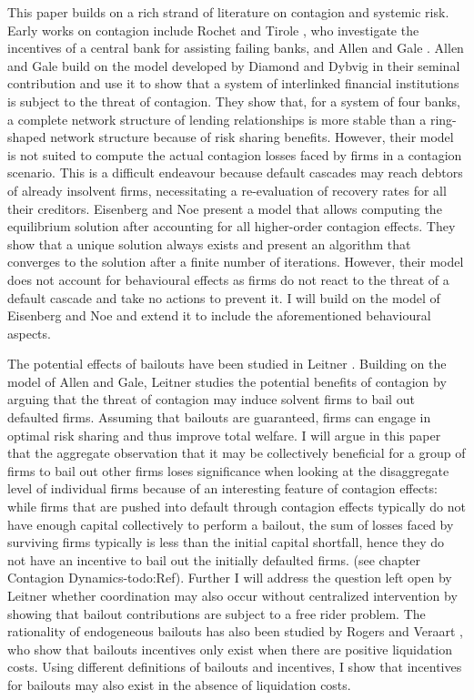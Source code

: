 \documentclass[12pt,a4paper]{article}
\begin{document}
This paper builds on a rich strand of literature on contagion and systemic risk. Early works on contagion include Rochet and Tirole \cite{Rochet1996}, who investigate the incentives of a central bank for assisting failing banks, and Allen and Gale \cite{Allen2000}. Allen and Gale build on the model developed by Diamond and Dybvig \cite{Diamond1983} in their seminal contribution and use it to show that a system of interlinked financial institutions is subject to the threat of contagion. They show that, for a system of four banks, a complete network structure of lending relationships is more stable than a ring-shaped network structure because of risk sharing benefits. However, their model is not suited to compute the actual contagion losses faced by firms in a contagion scenario. This is a difficult endeavour because default cascades may reach debtors of already insolvent firms, necessitating a re-evaluation of recovery rates for all their creditors. Eisenberg and Noe \cite{Eisenberg2001} present a model that allows computing the equilibrium solution after accounting for all higher-order contagion effects. They show that a unique solution always exists and present an algorithm that converges to the solution after a finite number of iterations. However, their model does not account for behavioural effects as firms do not react to the threat of a default cascade and take no actions to prevent it. I will build on the model of Eisenberg and Noe and extend it to include the aforementioned behavioural aspects.

The potential effects of bailouts have been studied in Leitner \cite{Leitner2005}. Building on the model of Allen and Gale, Leitner studies the potential benefits of contagion by arguing that the threat of contagion may induce solvent firms to bail out defaulted firms. Assuming that bailouts are guaranteed, firms can engage in optimal risk sharing and thus improve total welfare. I will argue in this paper that the aggregate observation that it may be collectively beneficial for a group of firms to bail out other firms loses significance when looking at the disaggregate level of individual firms because of an interesting feature of contagion effects: while firms that are pushed into default through contagion effects typically do not have enough capital collectively to perform a bailout, the sum of losses faced by surviving firms typically is less than the initial capital shortfall, hence they do not have an incentive to bail out the initially defaulted firms. (see chapter Contagion Dynamics-todo:Ref). Further I will address the question left open by Leitner whether coordination may also occur without centralized intervention by showing that bailout contributions are subject to a free rider problem. The rationality of endogeneous bailouts has also been studied by Rogers and Veraart \cite{Rogers2013}, who show that bailouts incentives only exist when there are positive liquidation costs. Using different definitions of bailouts and incentives, I show that incentives for bailouts may also exist in the absence of liquidation costs.
\end{document}
